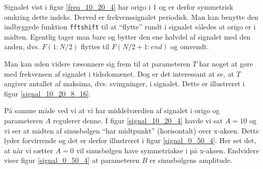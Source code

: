 \documentclass[a4paper, 10pt, danish, final]{article}
\begin{document}
Signalet vist i figur \ref{freq_10_20_4} har origo i 1 og er derfor
symmetrisk omkring dette indeks. Derved er frekvenssignalet periodisk.
Man kan benytte den indbyggede funktion \texttt{fftshift} til at
``flytte'' rundt i signalet således at origo er i midten. Egentlig tager
man bare og bytter den ene halvdel af signalet med den anden, dvs.
$F(1:N/2)$ flyttes til $F(N/2+1:end)$ og omvendt.

Man kan uden videre ræsonnere sig frem til at parameteren $T$ har noget
at gøre med frekvensen af signalet i tidsdomænet. Dog er det interessant
at se, at $T$ angiver antallet af maksima, dvs. svingninger, i signalet.
Dette er illustreret i figur \ref{signal_10_20_8_16}.

På samme måde ved vi at vi har middelværdien af signalet i origo og
parameteren $A$ regulerer denne. I figur \ref{signal_10_20_4} havde vi
sat $A = 10$ og vi ser at midten af sinusbølgen ``har midtpunkt''
(horisontalt) over x-aksen. Dette lyder forvirrende og det er derfor
illustreret i figur \ref{signal_0_50_4}. Her set det, at når vi sætter $A = 0$ vil
sinusbølgen have symmetriakse i på x-aksen. Endvidere viser figur
\ref{signal_0_50_4} at parameteren $B$ er sinusbølgens amplitude.
\end{document}
